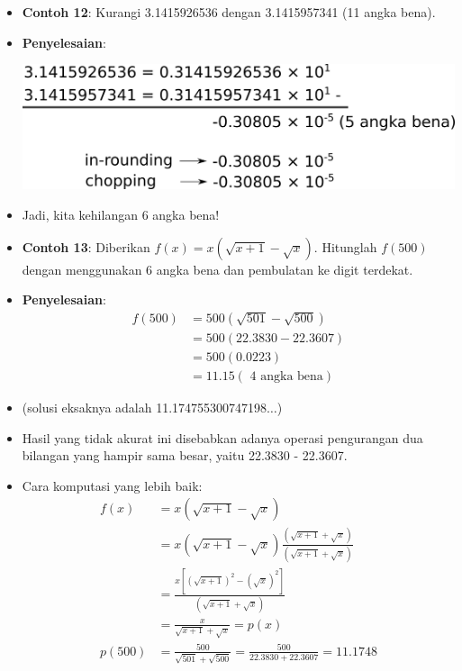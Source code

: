 \documentclass[pdflatex,compress]{beamer}
\begin{document}
\begin{frame}
	\begin{itemize}
		\item \textbf{Contoh 12}: Kurangi 3.1415926536 dengan
		3.1415957341 (11 angka bena).
		\item[] \textbf{Penyelesaian}:
		\begin{center}
			\includegraphics[width=0.8\linewidth]{img/img106.png}
		\end{center}
		\item[] Jadi, kita kehilangan 6 angka bena!	
	\end{itemize}
\end{frame}

\begin{frame}
	\begin{itemize}
		\item \textbf{Contoh 13}: Diberikan $ f(x) = x(\sqrt{x+1}-\sqrt{x}). $ Hitunglah $ f(500) $ dengan menggunakan 6 angka bena dan pembulatan ke digit terdekat.
		\item[] \textbf{Penyelesaian}:
		\begin{align*}
		f(500) &= 500(\sqrt{501}-\sqrt{500}) \\
		&= 500(22.3830- 22.3607) \\
		&= 500(0.0223) \\
		&= 11.15 (\text{ 4 angka bena})
		\end{align*}
		\item[] (solusi eksaknya adalah 11.174755300747198$\dots$)
		\item[] Hasil yang tidak akurat ini disebabkan adanya operasi pengurangan dua bilangan yang hampir sama besar, yaitu 22.3830 - 22.3607.
	\end{itemize}
\end{frame}

\begin{frame}
	\begin{itemize}
		\item Cara komputasi yang lebih baik:
		\begin{align*}
		f(x) &= x( \sqrt{x+1} - \sqrt{x}) \\
			 &= x( \sqrt{x+1} - \sqrt{x}) \frac{( \sqrt{x+1} + \sqrt{x})}{( \sqrt{x+1} + \sqrt{x})} \\
			 &= \frac{x[(\sqrt{x+1})^2 - (\sqrt{x})^2]}{(\sqrt{x+1} + \sqrt{x})} \\
			 &= \frac{x}{\sqrt{x+1} + \sqrt{x}} = p(x) \\
		p(500) &= \frac{500}{\sqrt{501}+\sqrt{500}} = \frac{500}{22 .3830 + 22.3607 } = 11 .1748 
		\end{align*}
	\end{itemize}
\end{frame}
\end{document}
